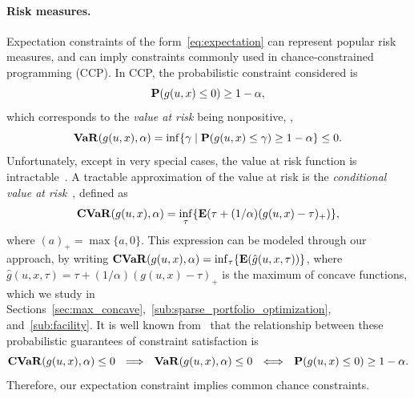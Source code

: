 \documentclass[12pt]{article}
\newcommand{\citep}{\cite}
\theoremstyle{thmstyleone}%
\theoremstyle{thmstyletwo}%
\theoremstyle{thmstylethree}%
\newcommand{\reviewChanges}{}
\begin{document}
\reviewChanges{
\paragraph{Risk measures.}%
\label{par:risk_measures}
Expectation constraints of the form~\eqref{eq:expectation} can represent popular risk measures, and can imply constraints commonly used in chance-constrained programming (CCP). 
In CCP, the probabilistic constraint considered is
  \begin{equation}
		\label{eq:chance}
		{\mathbf P}(g(u,x)\leq 0) \geq 1-\alpha,
	 \end{equation}
which corresponds to the {\it value at risk} being nonpositive, \ie,
\begin{equation*}
\mathop{\bf VaR}(g(u,x),\alpha) = \inf\{\gamma \mid {\mathbf P}(g(u,x)\leq \gamma) \geq 1-\alpha\} \leq 0.
\end{equation*}
Unfortunately, except in very special cases, the value at risk function is intractable~\citep{cvaropt}.
A tractable approximation of the value at risk is the {\it conditional value at risk}~\citep{cvaropt,cvar}, defined as
\begin{equation*}
\mathop{\bf CVaR}(g(u,x),\alpha) = \inf_{\tau}\{\mathbf{E}(\tau + (1/\alpha)(g(u,x)- \tau)_+)\},
\end{equation*}
where $(a)_+ = \max\{a,0\}$. 
This expression can be modeled through our approach, by writing $\mathop{\bf CVaR}(g(u,x),\alpha) = \inf_{\tau}\{\mathbf{E}(\hat{g}(u,x,\tau))\}$, where ${\hat{g}(u,x,\tau) = \tau + (1/\alpha)(g(u,x)- \tau)_+}$ is the maximum of concave functions, which we study in Sections~\ref{sec:max_concave},~\ref{sub:sparse_portfolio_optimization}, and~\ref{sub:facility}.
It is well known from~\cite{cvaropt} that the relationship between these probabilistic guarantees of constraint satisfaction is
\begin{equation*}
\mathop{\bf CVaR}(g(u,x),\alpha) \leq 0 ~~ \Longrightarrow~~ \mathop{\bf VaR}(g(u,x),\alpha)\leq 0 ~~\Longleftrightarrow ~~{\mathbf P}(g(u,x)\leq 0) \geq 1 - \alpha.
\end{equation*}
Therefore, our expectation constraint implies common chance constraints.
}
\end{document}
